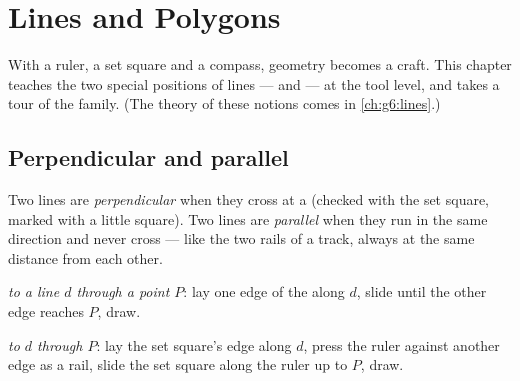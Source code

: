 \chapter{Lines and Polygons}\label{ch:g4:geometry}

With a ruler, a set square and a compass, geometry becomes a craft.
This chapter teaches the two special positions of lines ---
 and  --- at the tool level, and takes a tour of
the  family. (The theory of these notions comes in
\cref{ch:g6:lines}.)

\section{Perpendicular and parallel}

\begin{definition}\label{def:g4:geometry:def}
Two lines are \emph{perpendicular} when
they cross at a  (checked with the set square, marked with
a little square). Two lines are \emph{parallel}
when they run in the same direction and never cross --- like the two
rails of a track, always at the same distance from each other.
\end{definition}

\begin{method}\label{met:g4:geometry:draw}
\emph{ to a line $d$ through a point $P$}: lay one edge
of the  along $d$, slide until the other edge reaches $P$,
draw.

\emph{ to $d$ through $P$}: lay the set square's edge along
$d$, press the ruler against another edge as a rail, slide the set
square along the ruler up to $P$, draw.
\end{method}

